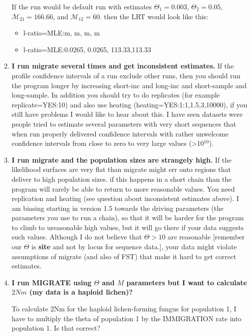 \begin{enumerate}
If the run would be default run with estimates $\Theta_1=0.003$, $\Theta_2=0.05$, $\mathcal{M}_{21}=166.66$, and  $\mathcal{M}_{12}=60$. then the  LRT would look like this:
\begin{itemize}
\item l-ratio=MLE:m, m, m, m 
\item l-ratio=MLE:0.0265, 0.0265, 113.33,113.33
\end{itemize}



\item {\bf I run migrate several times and get inconsistent estimates.}
If the profile confidence intervals of a run exclude other runs, then you should run
the program longer by increasing short-inc and long-inc and short-sample and long-sample.
In addition you should try to do replicates (for example replicate=YES:10) and also use
heating (heating=YES:1:{1,1.5,3,10000}), if you still have problems I would like to hear about this.
I have seen datasets were people tried to estimate several parameters with very short sequences that
when run properly delivered confidence intervals with rather unwelcome confidence intervals from
close to zero to very large values (>10$^{10}$).
\item {\bf I run migrate and the population sizes are strangely high.}
If the likelihood surfaces are very flat than migrate might err onto regions that deliver to high population sizes.
if this happens in a short chain than the program will rarely be able to return to more reasonable values.
You need replication and heating (see question about inconsistent estimates above). I am biasing starting in version 1.5
towards the driving parameters (the parameters you use to run a chain), so that it will be harder for the program to
climb to ureasonable high values, but it will go there if your data suggests such values. Although I do not believe that
$\Theta > 10$ are reasonable [remember our $\Theta$ is {\bf site} and not by locus for sequence data.], your data might
violate assumptions of migrate (and also of FST) that make it hard to get correct estimates. 

\item{\bf  I run MIGRATE using $\Theta$ and $M$ parameters but I want to calculate $2Nm$ (my data is a haploid lichen)?}

To calculate 2Nm for the haploid lichen-forming fungus for population 1, I have to multiply the theta of population 1 by the IMMIGRATION rate into population 1. Is that correct?


\end{enumerate}
